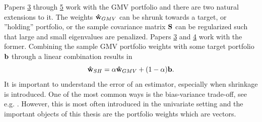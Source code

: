\documentclass[12pt, oneside]{book}\usepackage{knitr}
\begin{document}
Papers \hyperref[sec:paper3]{3} through \hyperref[sec:paper4]{5} work with the GMV portfolio and there are two natural extensions to it. 
The weights $\mathbf{\hat{w}}_{GMV}$ can be shrunk towards a target, or ''holding'' portfolio, or the sample covariance matrix $\mathbf{S}$ can be regularized such that large and small eigenvalues are penalized. 
Papers \hyperref[sec:paper3]{3} and \hyperref[sec:paper4]{4} work with the former.
Combining the sample GMV portfolio weights with some target portfolio $\mathbf{b}$ through a linear combination results in
\begin{equation}\label{eqn:linshrink}
  \mathbf{\hat{w}}_{SH} = \alpha\mathbf{\hat{w}}_{GMV} + (1-\alpha)\mathbf{b}.
\end{equation}
It is important to understand the error of an estimator, especially when shrinkage is introduced.
One of the most common ways is the bias-variance trade-off, see e.g. \citet[ch. 2.2]{james2013introduction}.
However, this is most often introduced in the univariate setting and the important objects of this thesis are the portfolio weights which are vectors.
\end{document}
